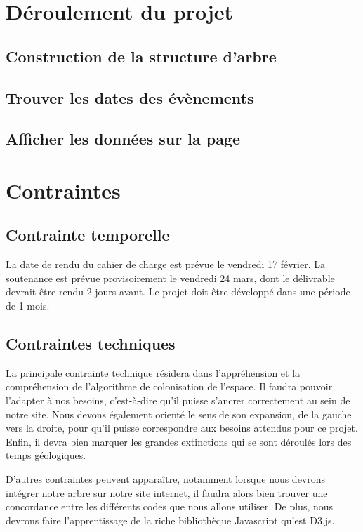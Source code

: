 \documentclass[a4paper]{article}
\begin{document}
{\section{Déroulement du projet}
	
			
	\subsection{Construction de la structure d'arbre}

			

	\subsection{Trouver les dates des évènements}

			

	\subsection{Afficher les données sur la page}
		

\section{Contraintes}

	\subsection{Contrainte temporelle}
		La date de rendu du cahier de charge est prévue le vendredi 17 février.
		La soutenance est prévue provisoirement le vendredi 24 mars, dont le délivrable devrait être rendu 2 jours avant.
		Le projet doit être développé dans une période de 1 mois.

	\subsection{Contraintes techniques}
		La principale contrainte technique résidera dans l'appréhension et la compréhension de l'algorithme de colonisation de l'espace. Il faudra pouvoir l'adapter à nos besoins, c'est-à-dire qu'il puisse s'ancrer correctement au sein de notre site. Nous devons également orienté le sens de son expansion, de la gauche vers la droite, pour qu'il puisse correspondre aux besoins attendus pour ce projet. Enfin, il devra bien marquer les grandes extinctions qui se sont déroulés lors des temps géologiques.

		D'autres contraintes peuvent apparaître, notamment lorsque nous devrons intégrer notre arbre sur notre site internet, il faudra alors bien trouver une concordance entre les différents codes que nous allons utiliser. De plus, nous devrons faire l'apprentissage de la riche bibliothèque Javascript qu'est D3.js.
		

}
\end{document}
